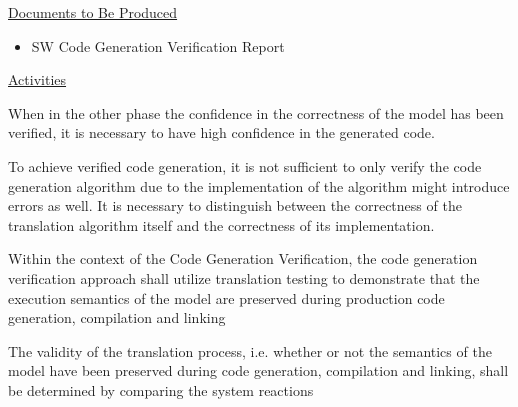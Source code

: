 \documentclass{template/openetcs_report}
\begin{document}
\underline{Documents to Be Produced} 

\begin{itemize}
\item SW Code Generation Verification Report
\end{itemize}

\underline{Activities}

When in the other phase the confidence in the correctness of the model has been verified, it is necessary to have high confidence in the generated code.

To achieve verified code generation, it is not sufficient
to only verify the code generation algorithm due to the implementation of the algorithm might introduce errors as well. It is necessary to distinguish between the correctness of the translation algorithm itself and the
correctness of its implementation.

Within the context of the Code Generation Verification, the code generation verification approach shall utilize translation testing to demonstrate
that the execution semantics of the model are preserved during production
code generation, compilation and linking

The validity of the translation process, i.e. whether or not the semantics
of the model have been preserved during code generation, compilation and linking, shall be determined by comparing the system reactions
\end{document}
